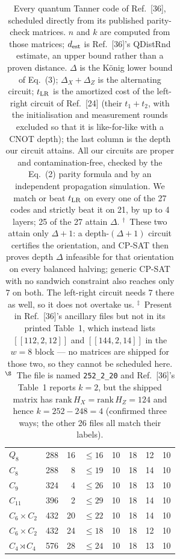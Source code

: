 \begin{table}
\begin{tabular}{@{}lrrrrrrr@{}}
$Q_8$             & 288 & 16 & $\leq 16$ & 10 & 18 & 12 & 10 \\
$C_8$             & 288 &  8 & $\leq 19$ & 10 & 18 & 14 & 10 \\
$C_9$             & 324 &  4 & $\leq 26$ & 10 & 18 & 13 & 10 \\
$C_{11}$          & 396 &  2 & $\leq 29$ & 10 & 18 & 14 & 10 \\
$C_6\times C_2$   & 432 & 20 & $\leq 22$ & 10 & 18 & 14 & 10 \\
$C_6\times C_2$   & 432 & 24 & $\leq 18$ & 10 & 18 & 12 & 10 \\
$C_4\rtimes C_4$  & 576 & 28 & $\leq 24$ & 10 & 18 & 13 & 10 \\
\bottomrule
\end{tabular}
\caption{Every quantum Tanner code of Ref.~[36], scheduled directly from its
published parity-check matrices. $n$ and $k$ are computed from those matrices;
$d_{\rm est}$ is Ref.~[36]'s QDistRnd estimate, an upper bound rather than a
proven distance. $\Delta$ is the K\"onig lower bound of Eq.~(3);
$\Delta_X{+}\Delta_Z$ is the alternating circuit; $t_{\rm LR}$ is the amortized
cost of the left-right circuit of Ref.~[24] (their $t_1+t_2$, with the
initialisation and measurement rounds excluded so that it is like-for-like with
a CNOT depth); the last column is the depth our circuit attains. All our
circuits are proper and contamination-free, checked by the Eq.~(2) parity
formula and by an independent propagation simulation. We match or beat
$t_{\rm LR}$ on every one of the 27 codes and strictly beat it on 21, by up to
4 layers; 25 of the 27 attain $\Delta$.
$^\dagger$~These two attain only $\Delta+1$: a depth-$(\Delta+1)$ circuit
certifies the orientation, and CP-SAT then proves depth $\Delta$ infeasible for
that orientation on every balanced halving; generic CP-SAT with no sandwich
constraint also reaches only $7$ on both. The left-right circuit needs $7$ there
as well, so it does not overtake us.
$^\ddagger$~Present in Ref.~[36]'s ancillary files but not in its printed
Table~1, which instead lists $[[112,2,12]]$ and $[[144,2,14]]$ in the $w=8$
block --- no matrices are shipped for those two, so they cannot be scheduled
here.
$^\S$~The file is named \texttt{252\_2\_20} and Ref.~[36]'s Table~1 reports
$k=2$, but the shipped matrix has $\mathrm{rank}\,H_X=\mathrm{rank}\,H_Z=124$
and hence $k=252-248=4$ (confirmed three ways; the other 26 files all match
their labels).}
\label{tab:qt-lift}
\end{table}
